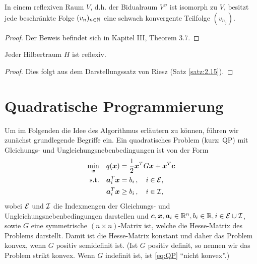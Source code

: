 \begin{theorem}\label{theorem:A.14}
In einem reflexiven Raum $V$, d.h. der Bidualraum $V''$ ist isomorph zu $V$, besitzt jede beschränkte Folge $(v_n)_{n\in \mathbb{N}}$ eine schwach konvergente Teilfolge $(v_{n_j})$.
\end{theorem}

\begin{proof}
Der Beweis befindet sich in \cite{Werner} Kapitel III, Theorem 3.7.
\end{proof}

\begin{bem}\label{bem:A.15}
Jeder Hilbertraum $H$ ist reflexiv.
\end{bem}

\begin{proof}
Dies folgt aus dem Darstellungssatz von Riesz (Satz \ref{satz:2.15}).
\end{proof}










\label{anhang:B}

\section{Quadratische Programmierung}
\label{anhang:B.1}

Um im Folgenden die Idee des Algorithmus erläutern zu können, führen wir zunächst grundlegende Begriffe ein. Ein quadratisches Problem (kurz: QP) mit Gleichungs- und Ungleichungsnebenbedingungen ist von der Form
\begin{align}\label{eq:QP}
\begin{aligned}
	\min_{\boldsymbol x} & \quad q(\boldsymbol x) = \frac 1 2 \boldsymbol x^T G\boldsymbol x + \boldsymbol x^T \boldsymbol c \\
	\text{s.t.} & \quad \boldsymbol a_i^T \boldsymbol x = b_i \, , \quad i \in \mathcal E, \\
	& \quad \boldsymbol a_i^T \boldsymbol x\ge b_i \, , \quad i \in \mathcal I,
\end{aligned}
\end{align}
wobei $\mathcal E$ und $ \mathcal I$ die Indexmengen der Gleichungs- und Ungleichungsnebenbedingungen darstellen und $\boldsymbol c,\boldsymbol x,\boldsymbol a_i \in \mathbb{R}^n, b_i \in \mathbb{R}, i \in \mathcal E \cup \mathcal I$, sowie $G$ eine symmetrische $(n\times n)$-Matrix ist, welche die Hesse-Matrix des Problems darstellt. Damit ist die Hesse-Matrix konstant und daher das Problem konvex, wenn $G$ positiv semidefinit ist. (Ist $G$ positiv definit, so nennen wir das Problem strikt konvex. Wenn $G$ indefinit ist, ist \eqref{eq:QP} "`nicht konvex"'.)

